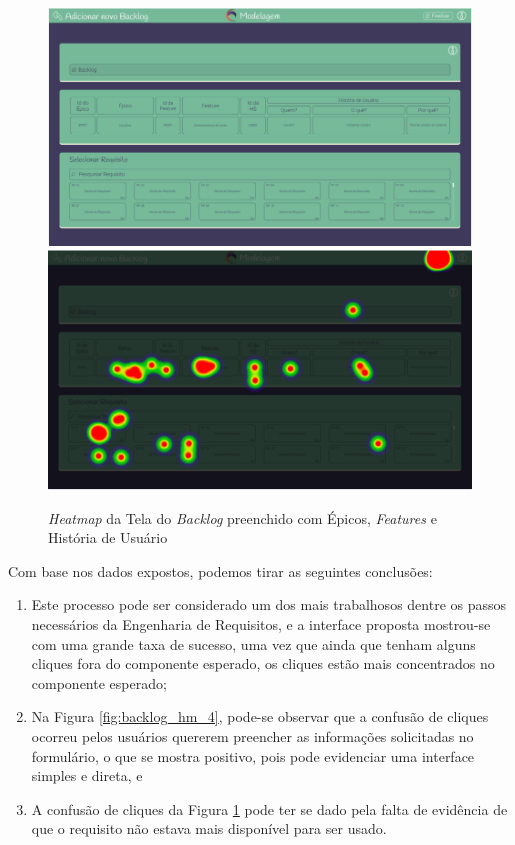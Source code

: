 \begin{figure}[]
  \begin{center}
      \caption{{\textit{Heatmap} da Tela do \textit{Backlog} preenchido com Épicos, \textit{Features} e História de Usuário}}
      \label{fig:backlog_hm_5}
      \includegraphics[scale=0.45]{figuras/UsabilityHub/backlog/9.png}
    \includegraphics[scale=0.45]{figuras/UsabilityHub/backlog/10.png}
\end{center}
\end{figure}

Com base nos dados expostos, podemos tirar as seguintes conclusões:

\begin{enumerate}
    \item Este processo pode ser considerado um dos mais trabalhosos dentre os passos necessários da Engenharia de Requisitos, e a interface proposta mostrou-se com uma grande taxa de sucesso, uma vez que ainda que tenham alguns cliques fora do componente esperado, os cliques estão mais concentrados no componente esperado;
    \item Na Figura \ref{fig:backlog_hm_4}, pode-se observar que a confusão de cliques ocorreu pelos usuários quererem preencher as informações solicitadas no formulário, o que se mostra positivo, pois pode evidenciar uma interface simples e direta, e
    \item A confusão de cliques da Figura \ref{fig:backlog_hm_5} pode ter se dado pela falta de evidência de que o requisito não estava mais disponível para ser usado.
\end{enumerate}

